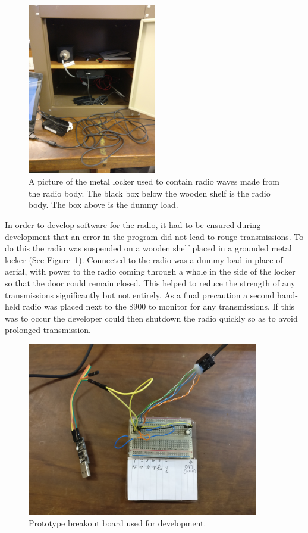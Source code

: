 \begin{figure}
    \centering
    \includegraphics[width=0.5\textwidth]{img/locker.jpg}
    \caption[Radio locker]{A picture of the metal locker used to contain radio waves made from the radio body. The black box below the wooden shelf is the radio body. The box above is the dummy load.}
    \label{fig:locker}
\end{figure}

In order to develop software for the radio, it had to be ensured during development that an error in the program did not lead to rouge transmissions. To do this the radio was suspended on a wooden shelf placed in a grounded metal locker (See Figure~\ref{fig:locker}). Connected to the radio was a dummy load in place of aerial, with power to the radio coming through a whole in the side of the locker so that the door could remain closed. This helped to reduce the strength of any transmissions significantly but not entirely. As a final precaution a second hand-held radio was placed next to the \gls{8900} to monitor for any transmissions. If this was to occur the developer could then shutdown the radio quickly so as to avoid prolonged transmission.

\begin{figure}
    \centering
    \includegraphics[width=0.9\textwidth]{img/bread_board}
    \caption[Prototype breakout board]{Prototype breakout board used for development.}
    \label{fig:brake_out_board}
\end{figure}

